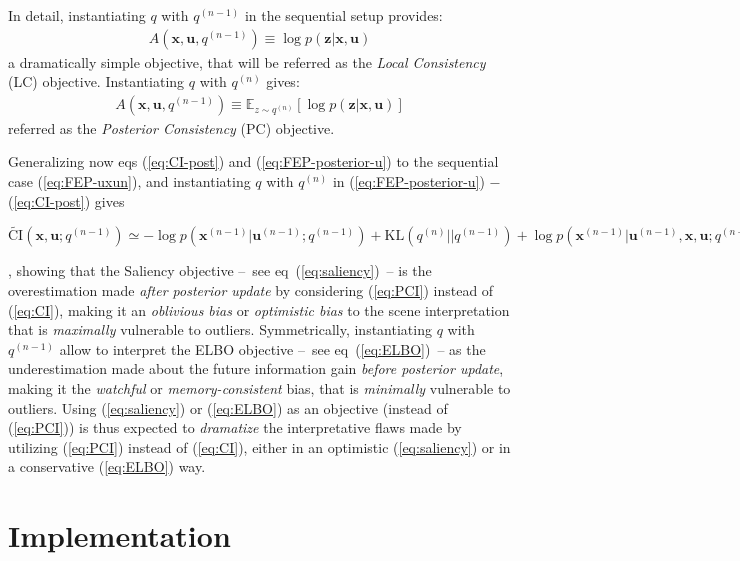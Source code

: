 \documentclass{article}
\begin{document}
In detail, instantiating $q$ with $q^{(n-1)}$ in the sequential setup provides:
\begin{align}A(\boldsymbol{x}, \boldsymbol{u}, q^{(n-1)}) \equiv \log p(\boldsymbol{z}|\boldsymbol{x}, \boldsymbol{u})\label{eq:LC}
\end{align}
a dramatically simple objective, that will be referred as the \emph{Local Consistency} (LC) objective.
Instantiating $q$ with $q^{(n)}$ gives:
\begin{align}A(\boldsymbol{x}, \boldsymbol{u}, q^{(n-1)}) \equiv 
\mathbb{E}_{z\sim q^{(n)}} \left[\log p(\boldsymbol{z}|\boldsymbol{x}, \boldsymbol{u})\right]\label{eq:PC}
\end{align}
referred as the \emph{Posterior Consistency} (PC) objective.

Generalizing now eqs (\ref{eq:CI-post}) and (\ref{eq:FEP-posterior-u}) to the sequential case (\ref{eq:FEP-uxun}), 
and instantiating $q$ with $q^{(n)}$ in  (\ref{eq:FEP-posterior-u}) $-$ (\ref{eq:CI-post}) gives
	\begin{small}
$
		\tilde{\text{CI}}(\boldsymbol{x},\boldsymbol{u}; q^{(n-1)}) \simeq
		-\log p(\boldsymbol{x}^{(n-1)}| \boldsymbol{u}^{(n-1)}; q^{(n-1)}) 
		+ \text{KL}(q^{(n)}||q^{(n-1)})
		+ \log p(\boldsymbol{x}^{(n-1)}| \boldsymbol{u}^{(n-1)}, \boldsymbol{x}, \boldsymbol{u}; q^{(n-1)}) 
$
	\end{small},
showing that the Saliency objective --~see eq~(\ref{eq:saliency})~-- is the overestimation made \emph{after posterior update} by considering (\ref{eq:PCI}) instead of (\ref{eq:CI}), making it an \emph{oblivious bias} or \emph{optimistic bias} to the scene interpretation that is \emph{maximally} vulnerable to outliers.
Symmetrically, 
instantiating $q$ with $q^{(n-1)}$  allow to interpret the ELBO objective
--~see eq~(\ref{eq:ELBO})~-- as  the underestimation made about the future information gain \emph{before posterior update}, making it the \emph{watchful} or \emph{memory-consistent} bias, that is \emph{minimally} vulnerable to outliers.
Using (\ref{eq:saliency}) or (\ref{eq:ELBO}) as an objective (instead of (\ref{eq:PCI})) is thus expected to \emph{dramatize} the interpretative flaws made by utilizing  (\ref{eq:PCI}) instead of (\ref{eq:CI}), either in an optimistic (\ref{eq:saliency}) or in a conservative (\ref{eq:ELBO}) way. 

\section{Implementation}
\end{document}
